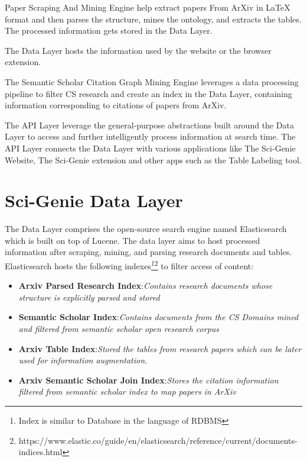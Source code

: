 Paper Scraping And Mining Engine help extract papers From ArXiv in LaTeX format and then parses the structure, mines the ontology, and extracts the tables. The processed information gets stored in the Data Layer. 

The Data Layer hosts the information used by the website or the browser extension. 

The Semantic Scholar Citation Graph Mining Engine leverages a data processing pipeline to filter CS research and create an index in the Data Layer, containing information corresponding to citations of papers from ArXiv. 

The API Layer leverage the general-purpose abstractions built around the Data Layer to access and further intelligently process information at search time. The API Layer connects the Data Layer with various applications like The Sci-Genie Website, The Sci-Genie extension and other apps such as the Table Labeling tool. 

\section{Sci-Genie Data Layer}
\label{sci-genie-core:data-layer}
The Data Layer comprises the open-source search engine named Elasticsearch\parencite{gormley2015elasticsearch} which is built on top of Lucene. 
The data layer aims to host processed information after scraping, mining, and parsing research documents and tables. 
Elasticsearch hosts the following indexes\footnote{Index is similar to Database in the language of RDBMS}\footnote{https://www.elastic.co/guide/en/elasticsearch/reference/current/documents-indices.html} to filter access of content:
\begin{itemize}
    \item \textbf{Arxiv Parsed Research Index}:\textit{Contains research documents whose structure is explicitly parsed and stored}
    \item \textbf{Semantic Scholar Index}:\textit{Contains documents from the CS Domains mined and filtered from semantic scholar open research corpus}
    \item \textbf{Arxiv Table Index}:\textit{Stored the tables from research papers which can be later used for information augmentation.}
    \item \textbf{Arxiv Semantic Scholar Join Index}:\textit{Stores the citation information filtered from semantic scholar index to map papers in ArXiv} 
\end{itemize} 

